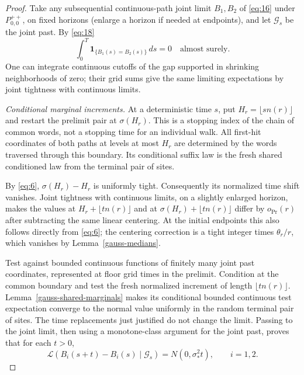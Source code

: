 \begin{proof}
Take any subsequential continuous-path joint limit \(B_1,B_2\) of \eqref{eq:16} under \(P_{0,0}^{++}\), on fixed horizons (enlarge a horizon if needed at endpoints), and let \(\mathcal G_s\) be the joint past. By \eqref{eq:18}
\[
\int_0^T\mathbf1_{\{B_1(s)=B_2(s)\}}\,ds=0\quad\text{almost surely}.
\tag{21}\label{eq:21}
\]
One can integrate continuous cutoffs of the gap supported in shrinking neighborhoods of zero; their grid sums give the same limiting expectations by joint tightness with continuous limits.

\emph{Conditional marginal increments.}
At a deterministic time \(s\), put \(H_r=\lfloor sn(r)\rfloor\)
and restart the prelimit pair at \(\sigma(H_r)\). This is a stopping
index of the chain of common words, not a stopping time for an
individual walk. All first-hit coordinates of both paths at levels
at most \(H_r\) are determined by the words traversed through this
boundary. Its conditional suffix law is the fresh shared conditioned
law from the terminal pair of sites.

By \eqref{eq:6}, \(\sigma(H_r)-H_r\) is uniformly tight.
Consequently its normalized time shift vanishes. Joint tightness with
continuous limits, on a slightly enlarged horizon, makes the values
at \(H_r+\lfloor tn(r)\rfloor\) and at
\(\sigma(H_r)+\lfloor tn(r)\rfloor\) differ by \(o_{\Pr}(r)\)
after subtracting the same linear centering. At the initial endpoints
this also follows directly from \eqref{eq:6}; the centering correction
is a tight integer times \(\theta_r/r\), which vanishes by
Lemma~\ref{gauss-medians}.

Test against bounded continuous functions of finitely many joint past
coordinates, represented at floor grid times in the prelimit. Condition
at the common boundary and test the fresh normalized increment of
length \(\lfloor tn(r)\rfloor\). Lemma~\ref{gauss-shared-marginals}
makes its conditional bounded continuous test expectation converge to
the normal value uniformly in the random terminal pair of sites.
The time replacements just justified do not change the limit. Passing
to the joint limit, then using a monotone-class argument for the joint
past, proves that for each \(t>0\),
\[
\mathcal L(B_i(s+t)-B_i(s)\mid\mathcal G_s)
=N(0,\sigma_*^2t),\qquad i=1,2.
\]


\end{proof}
